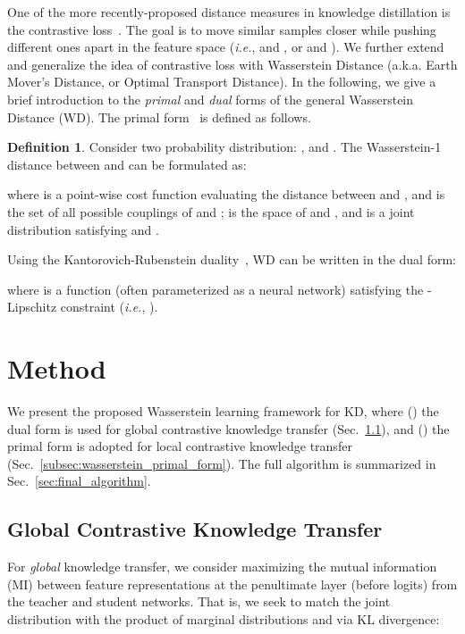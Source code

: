 \documentclass[final]{cvpr}
\theoremstyle{definition}
\newtheorem{definition}{Definition}[section]
\begin{document}
One of the more recently-proposed distance measures in knowledge distillation is the contrastive loss~\cite{tian2019contrastive}. The goal is to move similar samples closer while pushing different ones apart in the feature space (\emph{i.e.},  and , or  and ). We further extend and generalize the idea of contrastive loss with Wasserstein Distance (a.k.a. Earth Mover's Distance, or Optimal Transport Distance).
In the following, we give a brief introduction to the \emph{primal} and \emph{dual} forms of the general Wasserstein Distance (WD). 
The primal form~\cite{villani2008optimal} is defined as follows.
\begin{definition} \label{def:wd}
    Consider two probability distribution: , and .
The Wasserstein-1 distance between  and  can be formulated as:

where  is a point-wise cost function evaluating the distance between  and , and  is the set of all possible couplings of  and ;  is the space of  and , and  is a joint distribution satisfying  and . 
\end{definition}
Using the Kantorovich-Rubenstein duality~\cite{villani2008optimal}, WD can be written in the dual form:

where  is a function (often parameterized as a neural network) satisfying the -Lipschitz constraint (\emph{i.e.}, ).


\section{Method}




We present the proposed Wasserstein learning framework for KD, where () the dual form is used for global contrastive knowledge transfer (Sec.~\ref{subsec:wasserstein_dual_form}), and () the primal form is adopted for local contrastive knowledge transfer (Sec.~\ref{subsec:wasserstein_primal_form}). The full algorithm is summarized in Sec.~\ref{sec:final_algorithm}.


\subsection{Global Contrastive Knowledge Transfer}\label{subsec:wasserstein_dual_form}


For \emph{global} knowledge transfer, we consider maximizing the mutual information (MI) between feature representations  at the penultimate layer (before logits) from the teacher and student networks. That is, we seek to match the joint distribution  with the product of marginal distributions  and  via KL divergence:
\end{document}
